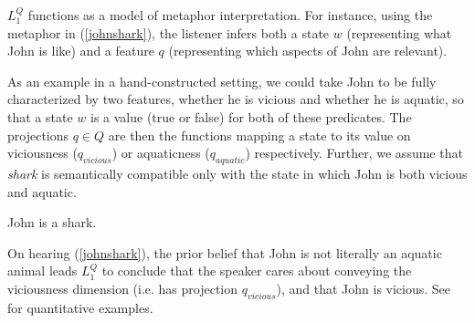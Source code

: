 \documentclass[9pt,twocolumn,twoside,lineno]{pnas-new}
\newcommand{\Listener}{L}
\newcommand{\QLONE}{\Listener_{{1}}^{{Q}}}
\begin{document}
	$\QLONE$ functions as a model of metaphor interpretation. For instance, using the metaphor in (\ref{johnshark}), the listener infers both a state $w$ (representing what John is like) and a feature $q$ (representing which aspects of John are relevant).

	As an example in a hand-constructed setting, we could take John to be fully characterized by two features, whether he is vicious and whether he is aquatic, so that a state $w$ is a value (true or false) for both of these predicates. The projections $q\in Q$ are then the functions mapping a state to its value on viciousness ($q_{vicious}$) or aquaticness ($q_{aquatic}$) respectively. Further, we assume that \emph{shark} is semantically compatible only with the state in which John is both vicious and aquatic.



	\begin{examples}
	\item John is a shark. \label{johnshark}
	\end{examples}

	




		
	
	On hearing (\ref{johnshark}), the prior belief that John is not literally an aquatic animal leads $\QLONE$ to conclude that the speaker cares about conveying the viciousness dimension (i.e. has projection $q_{vicious}$), and that John is vicious. See \cite{kao} for quantitative examples.
\end{document}
